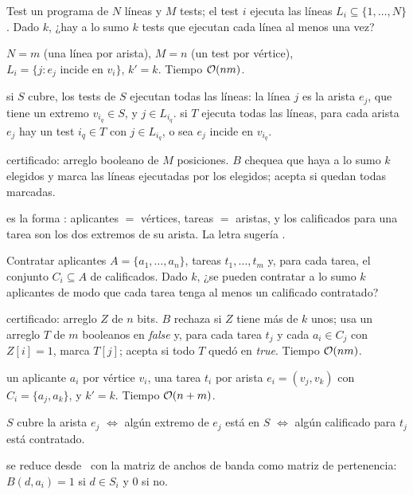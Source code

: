 \begin{problema}{Test}
 un programa de $N$ líneas y $M$ tests; el test $i$ ejecuta las líneas $L_i\subseteq\{1,\dots,N\}$. Dado $k$, ¿hay a lo sumo $k$ tests que ejecutan cada línea al menos una vez?

 $N=m$ (una línea por arista), $M=n$ (un test por vértice), $L_i=\{j : e_j \text{ incide en } v_i\}$, $k'=k$. Tiempo $\mathcal{O}(nm)$.

 si $S$ cubre, los tests de $S$ ejecutan todas las líneas: la línea $j$ es la arista $e_j$, que tiene un extremo $v_{i_q}\in S$, y $j\in L_{i_q}$.  si $T$ ejecuta todas las líneas, para cada arista $e_j$ hay un test $i_q\in T$ con $j\in L_{i_q}$, o sea $e_j$ incide en $v_{i_q}$.

 certificado: arreglo booleano de $M$ posiciones. $B$ chequea que haya a lo sumo $k$ elegidos y marca las líneas ejecutadas por los elegidos; acepta si quedan todas marcadas.
\end{problema}

 es la forma : aplicantes $=$ vértices, tareas $=$ aristas, y los calificados para una tarea son los dos extremos de su arista. La letra sugería \npVC.

\begin{problema}{Contratar}
 aplicantes $A=\{a_1,\dots,a_n\}$, tareas $t_1,\dots,t_m$ y, para cada tarea, el conjunto $C_i\subseteq A$ de calificados. Dado $k$, ¿se pueden contratar a lo sumo $k$ aplicantes de modo que cada tarea tenga al menos un calificado contratado?

 certificado: arreglo $Z$ de $n$ bits. $B$ rechaza si $Z$ tiene más de $k$ unos; usa un arreglo $T$ de $m$ booleanos en \textit{false} y, para cada tarea $t_j$ y cada $a_i\in C_j$ con $Z[i]=1$, marca $T[j]$; acepta si todo $T$ quedó en \textit{true}. Tiempo $\mathcal{O}(nm)$.

 un aplicante $a_i$ por vértice $v_i$, una tarea $t_i$ por arista $e_i=(v_j,v_k)$ con $C_i=\{a_j,a_k\}$, y $k'=k$. Tiempo $\mathcal{O}(n+m)$.

 $S$ cubre la arista $e_j$ $\iff$ algún extremo de $e_j$ está en $S$ $\iff$ algún calificado para $t_j$ está contratado.
\end{problema}

 se reduce desde \npSC\ con la matriz de anchos de banda como matriz de pertenencia: $B(d,a_i)=1$ si $d\in S_i$ y 0 si no.

